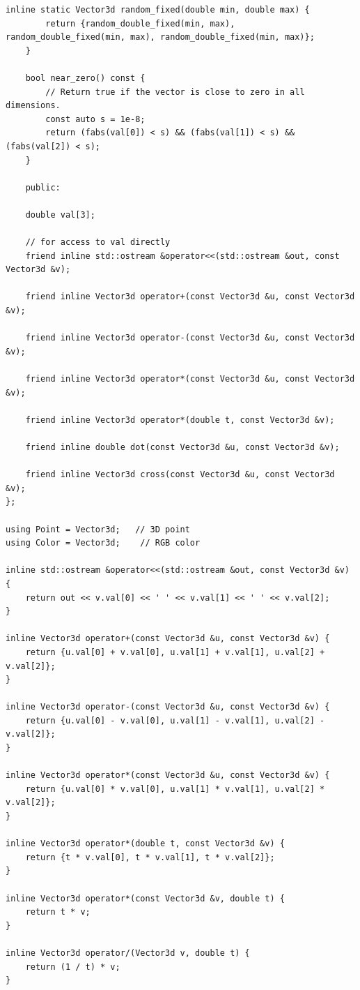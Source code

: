 \documentclass[utf8]{article}
\begin{document}
\begin{lstlisting}[style=CStyle]
	inline static Vector3d random_fixed(double min, double max) {
		return {random_double_fixed(min, max), random_double_fixed(min, max), random_double_fixed(min, max)};
	}
	
	bool near_zero() const {
		// Return true if the vector is close to zero in all dimensions.
		const auto s = 1e-8;
		return (fabs(val[0]) < s) && (fabs(val[1]) < s) && (fabs(val[2]) < s);
	}
	
	public:
	
	double val[3];
	
	// for access to val directly
	friend inline std::ostream &operator<<(std::ostream &out, const Vector3d &v);
	
	friend inline Vector3d operator+(const Vector3d &u, const Vector3d &v);
	
	friend inline Vector3d operator-(const Vector3d &u, const Vector3d &v);
	
	friend inline Vector3d operator*(const Vector3d &u, const Vector3d &v);
	
	friend inline Vector3d operator*(double t, const Vector3d &v);
	
	friend inline double dot(const Vector3d &u, const Vector3d &v);
	
	friend inline Vector3d cross(const Vector3d &u, const Vector3d &v);
};

using Point = Vector3d;   // 3D point
using Color = Vector3d;    // RGB color

inline std::ostream &operator<<(std::ostream &out, const Vector3d &v) {
	return out << v.val[0] << ' ' << v.val[1] << ' ' << v.val[2];
}

inline Vector3d operator+(const Vector3d &u, const Vector3d &v) {
	return {u.val[0] + v.val[0], u.val[1] + v.val[1], u.val[2] + v.val[2]};
}

inline Vector3d operator-(const Vector3d &u, const Vector3d &v) {
	return {u.val[0] - v.val[0], u.val[1] - v.val[1], u.val[2] - v.val[2]};
}

inline Vector3d operator*(const Vector3d &u, const Vector3d &v) {
	return {u.val[0] * v.val[0], u.val[1] * v.val[1], u.val[2] * v.val[2]};
}

inline Vector3d operator*(double t, const Vector3d &v) {
	return {t * v.val[0], t * v.val[1], t * v.val[2]};
}

inline Vector3d operator*(const Vector3d &v, double t) {
	return t * v;
}

inline Vector3d operator/(Vector3d v, double t) {
	return (1 / t) * v;
}


\end{lstlisting}
\end{document}
